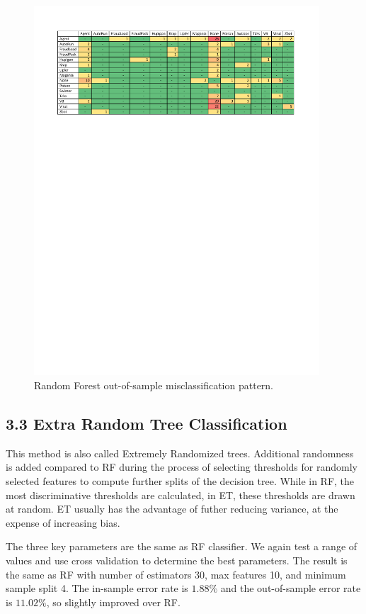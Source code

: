 \documentclass[submit]{harvardml}
\begin{document}
\begin{figure}[htbp]
\centering
\includegraphics[width=0.95\textwidth]{RF_out}
\caption{Random Forest out-of-sample misclassification pattern.}
\label{fig:rf_out}
\end{figure}

\subsection*{3.3 Extra Random Tree Classification}
This method is also called Extremely Randomized trees. Additional randomness is added compared to RF during the process of selecting thresholds for randomly selected features to compute further splits of the decision tree. While in RF, the most discriminative thresholds are calculated, in ET, these thresholds are drawn at random. ET usually has the advantage of futher reducing variance, at the expense of increasing bias.

The three key parameters are the same as RF classifier. We again test a range of values and use cross validation to determine the best parameters. The result is the same as RF with number of estimators 30, max features 10, and minimum sample split 4. The in-sample error rate is $1.88\%$ and the out-of-sample error rate is $11.02\%$, so slightly improved over RF.
\end{document}
